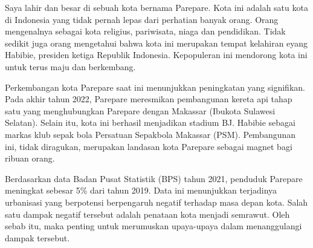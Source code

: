 \documentclass{article}
\begin{document}
Saya lahir dan besar di sebuah kota  bernama Parepare.
Kota ini adalah satu kota di Indonesia yang tidak pernah lepas dari perhatian banyak orang.
Orang mengenalnya sebagai kota religius, pariwisata, niaga dan pendidikan.
Tidak sedikit juga orang mengetahui bahwa kota ini merupakan tempat kelahiran eyang Habibie, presiden ketiga Republik Indonesia.
Kepopuleran ini mendorong kota ini untuk terus maju dan berkembang.

Perkembangan kota Parepare saat ini menunjukkan peningkatan yang signifikan.
Pada akhir tahun 2022, Parepare meresmikan pembangunan kereta api tahap satu yang menghubungkan Parepare dengan Makassar (Ibukota Sulawesi Selatan).
Selain itu, kota ini berhasil menjadikan stadium BJ. Habibie sebagai markas klub sepak bola Persatuan Sepakbola Makassar (PSM).
Pembangunan ini, tidak diragukan, merupakan landasan kota Parepare sebagai magnet bagi ribuan orang.


Berdasarkan data Badan Pusat Statistik (BPS) tahun 2021, penduduk Parepare meningkat sebesar 5\% dari tahun 2019.
Data ini menunjukkan terjadinya urbanisasi yang berpotensi berpengaruh negatif terhadap masa depan kota. Salah satu dampak negatif tersebut adalah penataan kota menjadi semrawut.
Oleh sebab itu, maka penting untuk merumuskan upaya-upaya dalam menanggulangi dampak tersebut.






\end{document}
